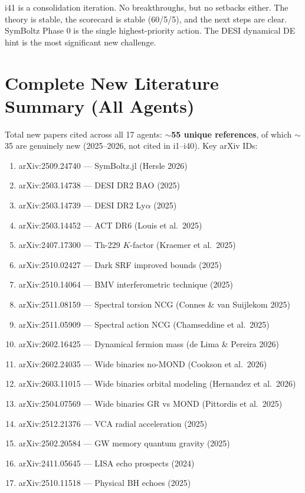 \documentclass[11pt,a4paper]{article}
\begin{document}
i41 is a consolidation iteration. No breakthroughs, but no setbacks either. The theory is stable, the scorecard is stable (60/5/5), and the next steps are clear. SymBoltz Phase 0 is the single highest-priority action. The DESI dynamical DE hint is the most significant new challenge.

\section{Complete New Literature Summary (All Agents)}

Total new papers cited across all 17 agents: \textbf{$\sim$55 unique references}, of which $\sim$35 are genuinely new (2025--2026, not cited in i1--i40). Key arXiv IDs:

\begin{enumerate}
\item arXiv:2509.24740 --- SymBoltz.jl (Hersle 2026)
\item arXiv:2503.14738 --- DESI DR2 BAO (2025)
\item arXiv:2503.14739 --- DESI DR2 Ly$\alpha$ (2025)
\item arXiv:2503.14452 --- ACT DR6 (Louis et al.\ 2025)
\item arXiv:2407.17300 --- Th-229 $K$-factor (Kraemer et al.\ 2025)
\item arXiv:2510.02427 --- Dark SRF improved bounds (2025)
\item arXiv:2510.14064 --- BMV interferometric technique (2025)
\item arXiv:2511.08159 --- Spectral torsion NCG (Connes \& van Suijlekom 2025)
\item arXiv:2511.05909 --- Spectral action NCG (Chamseddine et al.\ 2025)
\item arXiv:2602.16425 --- Dynamical fermion mass (de Lima \& Pereira 2026)
\item arXiv:2602.24035 --- Wide binaries no-MOND (Cookson et al.\ 2026)
\item arXiv:2603.11015 --- Wide binaries orbital modeling (Hernandez et al.\ 2026)
\item arXiv:2504.07569 --- Wide binaries GR vs MOND (Pittordis et al.\ 2025)
\item arXiv:2512.21376 --- VCA radial acceleration (2025)
\item arXiv:2502.20584 --- GW memory quantum gravity (2025)
\item arXiv:2411.05645 --- LISA echo prospects (2024)
\item arXiv:2510.11518 --- Physical BH echoes (2025)

\end{enumerate}
\end{document}
